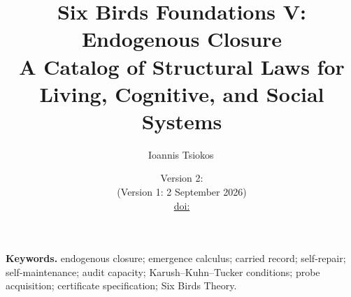 \documentclass[11pt]{article}
\title{Six Birds Foundations V: Endogenous Closure\\
A Catalog of Structural Laws for Living, Cognitive, and Social Systems}
\author{Ioannis Tsiokos\,\orcidlink{0009-0009-7659-5964}}
\date{Version 2: \manuscriptdate\\[2pt] \footnotesize (Version 1: 2 September 2026)%
  \ifpaperhasdoi\\\small\href{https://doi.org/\paperdoi}{doi:\paperdoi}\fi}
\theoremstyle{definition}
\theoremstyle{plain}\newtheorem*{headline}{Theorem}
\begin{document}
\maketitle
\thispagestyle{firstpage}

\begin{abstract}

\end{abstract}

\medskip
\noindent\textbf{Keywords.} endogenous closure; emergence calculus; carried record; self-repair; self-maintenance;
audit capacity; Karush--Kuhn--Tucker conditions; probe acquisition; certificate specification;
Six Birds Theory.










\clearpage



\appendix

\end{document}
